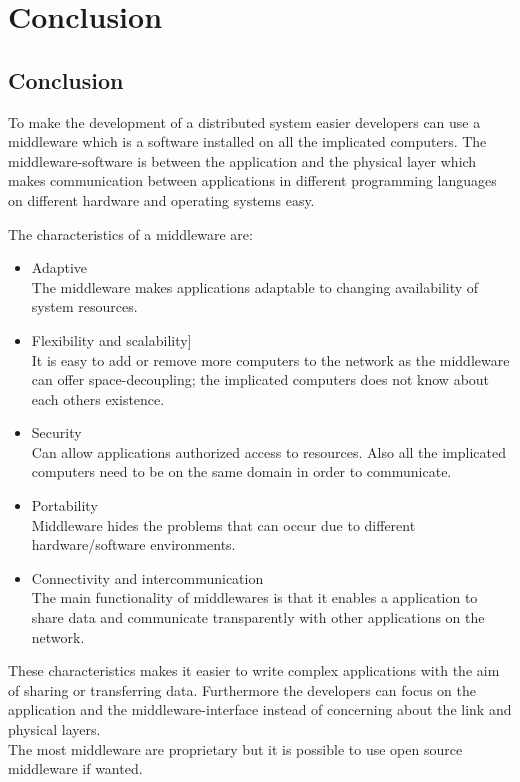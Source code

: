 \documentclass[Main]{subfiles}
\begin{document}
\chapter{Conclusion}

\section{Conclusion}
To make the development of a distributed system easier developers can use a middleware which is a software installed on all the implicated computers. The middleware-software is between the application and the physical layer which makes communication between applications in different programming languages on different hardware and operating systems easy.

The characteristics of a middleware are:
\begin{itemize}
\item Adaptive\\The middleware makes applications adaptable to changing availability of system resources.
\item Flexibility and scalability]\\It is easy to add or remove more computers to the network as the middleware can offer space-decoupling; the implicated computers does not know about each others existence.
\item Security\\Can allow applications authorized access to resources. Also all the implicated computers need to be on the same domain in order to communicate.
\item Portability\\Middleware hides the problems that can occur due to different hardware/software environments.
\item Connectivity and intercommunication\\The main functionality of middlewares is that it enables a application to share data and communicate transparently with other applications on the network.
\end{itemize}

These characteristics makes it easier to write complex applications with the aim of sharing or transferring data. Furthermore the developers can focus on the application and the middleware-interface instead of concerning about the link and physical layers.\\The most middleware are proprietary but it is possible to use open source middleware if wanted.
\end{document}
